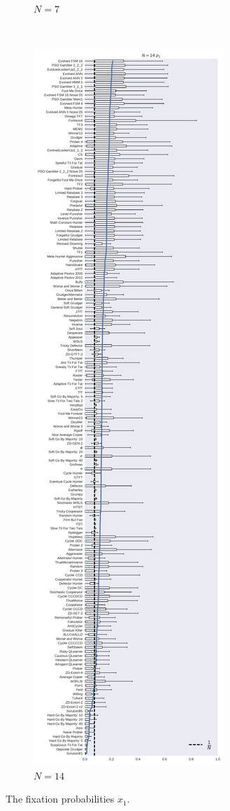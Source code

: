 \documentclass[10pt,journal]{IEEEtran}
\begin{document}
\begin{figure}[!hbtp]
\begin{subfigure}{.3\columnwidth}
        \caption{\(N=7\)}
        \label{fig:boxplot_7_invade}
    \end{subfigure}%
    ~
    \begin{subfigure}{.3\columnwidth}
        \centering
        \includegraphics[width=\columnwidth]{img/boxplot_14_invade.pdf}
        \caption{\(N=14\)}
        \label{fig:boxplot_14_invade}
    \end{subfigure}
    \caption{The fixation probabilities \(x_1\).}
\end{figure}
\end{document}
